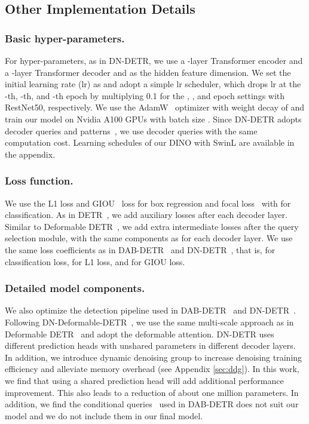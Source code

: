 \documentclass[runningheads]{llncs}
\begin{document}
\subsection{Other Implementation Details}\label{sec:imp_details}

\subsubsection{Basic hyper-parameters.}
For hyper-parameters, as in DN-DETR, we use a -layer Transformer encoder and a -layer Transformer decoder and  as the hidden feature dimension. We set the initial learning rate (lr) as  and adopt a simple lr scheduler, which drops lr at the -th, -th, and -th epoch by multiplying 0.1 for the , , and  epoch settings with RestNet50, respectively. We use the AdamW~\cite{kingma2014adam,loshchilov2017decoupled} optimizer with weight decay of  and train our model on Nvidia A100 GPUs with batch size . Since DN-DETR \cite{li2022dn} adopts  decoder queries and  patterns~\cite{wang2021anchor}, we use  decoder queries with the same computation cost. Learning schedules of our DINO with SwinL are available in the appendix.

\subsubsection{Loss function.}
We use the L1 loss and GIOU~\cite{rezatofighi2019generalized} loss for box regression and focal loss~\cite{lin2018focal} with  for classification. As in DETR~\cite{carion2020end}, we add auxiliary losses after each decoder layer. Similar to Deformable DETR~\cite{zhu2020deformable}, we add extra intermediate losses after the query selection module, with the same components as for each decoder layer. We use the same loss coefficients as in DAB-DETR~\cite{liu2022dab} and DN-DETR~\cite{li2022dn}, that is,  for classification loss,  for L1 loss, and  for GIOU loss.

\subsubsection{Detailed model components.}
We also optimize the detection pipeline used in DAB-DETR~\cite{liu2022dab} and DN-DETR~\cite{li2022dn}. Following DN-Deformable-DETR~\cite{li2022dn}, we use the same multi-scale approach as in Deformable DETR~\cite{zhu2020deformable} and adopt the deformable attention. DN-DETR uses different prediction heads with unshared parameters in different decoder layers. In addition, we introduce dynamic denoising group to increase denoising training efficiency and alleviate memory overhead (see Appendix \ref{sec:ddg}). In this work, we find that using a shared prediction head will add additional performance improvement. This also leads to a reduction of about one million parameters. In addition, we find the conditional queries~\cite{meng2021conditional} used in DAB-DETR does not suit our model and we do not include them in our final model. 
\end{document}
